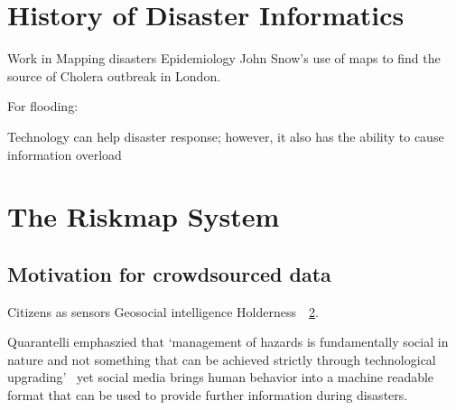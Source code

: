 \section{History of Disaster Informatics}
Work in Mapping disasters
Epidemiology John Snow's use of maps to find the source of Cholera outbreak in
London\cite{rogersJohnSnowData2013}.

For flooding: \cite{ahernGlobalHealthImpacts2005}

Technology can help disaster response; however, it also has the ability to cause
information overload\cite{tierneyFacingUnexpectedDisaster2001}



\section{The Riskmap System}\label{ch1:riskmap}


\subsection{Motivation for crowdsourced data}
Citizens as sensors
Geosocial intelligence
Holderness~\cite{holdernessSocialMediaGeoSocial2015a}~\ref{ch1:riskmap}.

Quarantelli emphaszied that  `management of hazards is fundamentally social in
nature and not something that can be achieved strictly through technological
upgrading'~\cite{tierneyFacingUnexpectedDisaster2001} yet social media brings
human behavior into a machine readable format that can be used to provide
further information during disasters.


\subsection{}

